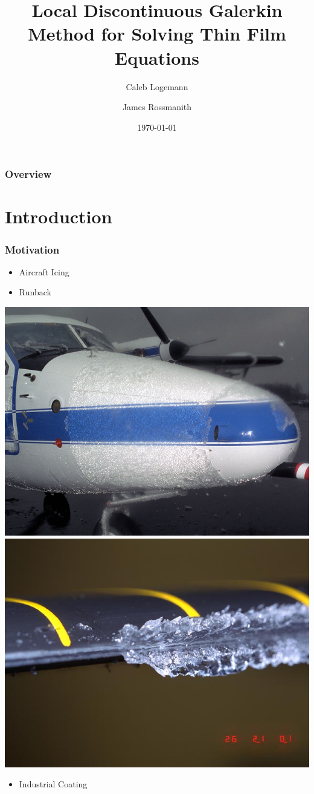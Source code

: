 \documentclass[10pt]{beamer}
\title[]{Local Discontinuous Galerkin Method for Solving Thin Film Equations} %
\author{Caleb Logemann \and James Rossmanith} %
\institute[Iowa State University]{%
Mathematics Department,\\ Iowa State University \\ %
\medskip
\textit{logemann@iastate.edu}} %
\date{\today} %
\begin{document}
  \begin{frame}
    \titlepage{}
  \end{frame}

  \begin{frame}
    \frametitle{Overview}
    \tableofcontents
  \end{frame}

  \section{Introduction}
    \begin{frame}
      \frametitle{Motivation}
      \begin{itemize}
        \item Aircraft Icing
        \item Runback
      \end{itemize}
      \begin{center}
        \includegraphics[scale=0.2]{Figures/Icing_on_a_plane.jpg}
        \hspace{0.1in}
        \includegraphics[scale=0.2]{Figures/Icing_on_a_rotor.jpg}
      \end{center}
      \begin{itemize}
        \item Industrial Coating
      \end{itemize}
    \end{frame}
\end{document}
